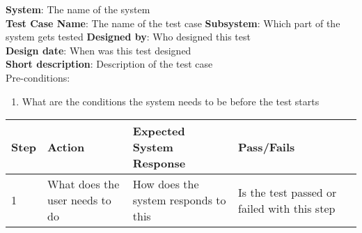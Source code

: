 \textbf{System}:  The name of the system \\
\textbf{Test Case Name}:  The name of the test case
\textbf{Subsystem}:  Which part of the system gets tested
\textbf{Designed by}:  Who designed this test\\
\textbf{Design date}: When was this test designed \\
\textbf{Short description}: Description of the test case \\

Pre-conditions: \\
\begin{enumerate}
\item What are the conditions the system needs to be before the test starts
\end{enumerate}

\begin{longtable}{ | p{0.8cm} | p{4.5cm} | p{6cm} | p{1.5cm} | p{1.5cm} |}
\hline
Step & Action & Expected System Response & Pass/Fails  \\ \hline
1 & What does the user needs to do & How does the system responds to this & Is the test passed or failed with this step  \\ \hline

\end{longtable}